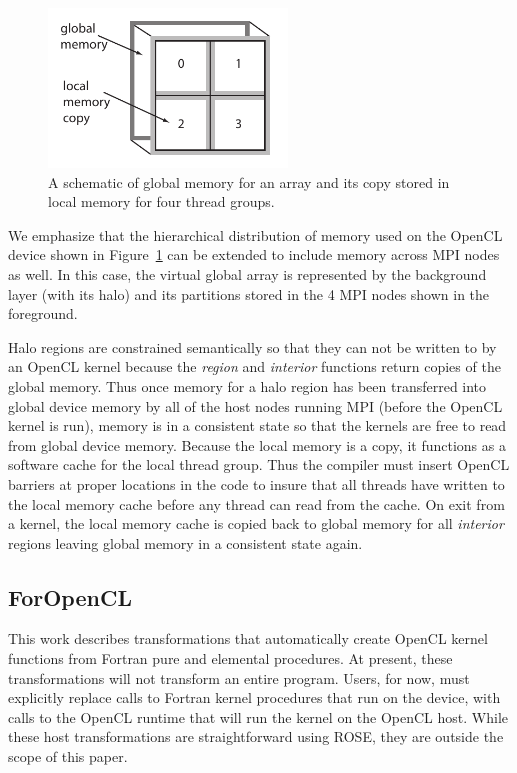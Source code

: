 \begin{figure}[!t]
\centering
\includegraphics[width=2.5in]{cl-memory.pdf}
\caption{A schematic of global memory for an array and its copy stored in local memory
for four thread groups.}
\label{fig:cl-memory}
\end{figure}

We emphasize that the hierarchical distribution of memory used on the OpenCL
device shown in Figure~\ref{fig:cl-memory} can be extended to include memory
across MPI nodes as well.  In this case, the virtual global array is
represented by the background layer (with its halo) and its partitions stored
in the 4 MPI nodes shown in the foreground.

Halo regions are constrained semantically so that they can not be written to
by an OpenCL kernel because the \emph{region} and \emph{interior} functions
return copies of the global memory.  Thus once memory for a halo region has
been transferred into global device memory by all of the host nodes running
MPI (before the OpenCL kernel is run), memory is in a consistent state so that
the kernels are free to read from global device memory.  Because the local
memory is a copy, it functions as a software cache for the local thread group.
Thus the compiler must insert OpenCL barriers at proper locations in the code
to insure that all threads have written to the local memory cache before any
thread can read from the cache.  On exit from a kernel, the local memory cache
is copied back to global memory for all \emph{interior} regions leaving global
memory in a consistent state again.

\subsection{ForOpenCL}

This work describes transformations that automatically create OpenCL kernel
functions from Fortran pure and elemental procedures.  At present, these transformations
will not transform an entire program.  Users, for now, must explicitly replace
calls to Fortran kernel procedures that run on the device, with calls to the
OpenCL runtime that will run the kernel on the OpenCL host.  While these host
transformations are straightforward using ROSE, they are outside the scope of
this paper.

